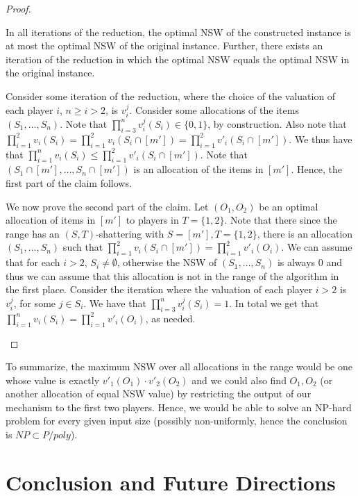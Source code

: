 \documentclass{theoretics}
\begin{document}
\begin{proof}
\begin{claim*}
In all iterations of the reduction, the optimal NSW of the constructed instance is at most the optimal NSW of the original instance. Further, there exists an iteration of the reduction in which the optimal NSW equals the optimal NSW in the original instance. 
\end{claim*}
\begin{subproof}
Consider some iteration of the reduction, where the choice of the valuation of each player $i$, $n\geq i>2$, is $v_i^j$. Consider some allocations of the items $(S_1,\ldots, S_n)$. Note that $\prod_{i=3}^{n} v_i^j(S_i)\in \{0,1\}$, by construction. Also note that $\prod_{i=1}^{2} v_i(S_i)=\prod_{i=1}^{2} v_i(S_i\cap [m'])=\prod_{i=1}^{2} v'_i(S_i\cap [m'])$. We thus have that $\prod_{i=1}^{n} v_i(S_i) \leq \prod_{i=1}^{2} v'_i(S_i\cap [m'])$.  Note that $(S_1\cap [m'], \ldots, S_n \cap [m'])$ is an allocation of the items in $[m']$. Hence, the first part of the claim follows.

We now prove the second part of the claim. Let $(O_1,O_2)$ be an optimal allocation of items in $[m']$ to players in $T=\{1,2\}$. Note that there since the range has an $(S,T)$-shattering with $S = [m'], T=\{1,2\}$, there is an allocation $(S_1,\ldots, S_n)$ such that $\prod_{i=1}^{2} v_i(S_i \cap [m']) = \prod_{i=1}^{2}{v'_i}(O_i)$. We can assume that for each $i > 2$, $S_i \neq \emptyset$, otherwise the NSW of $(S_1,\ldots, S_n)$ is always $0$ and thus we can assume that this allocation is not in the range of the algorithm in the first place. Consider the iteration where the valuation of each player $i>2$ is $v_i^j$, for some $j \in S_i$. We have that $\prod_{i=3}^{n} v_i^j(S_i)=1$. In total we get that $\prod_{i=1}^{n} v_i(S_i) = \prod_{i=1}^{2} v'_i(O_i)$, as needed.
\end{subproof}
\end{proof}


To summarize, the maximum NSW over all allocations in the range would be one whose value is exactly $v'_1(O_1)\cdot  v'_2(O_2)$ and we could also find $O_1, O_2$ (or another allocation of equal NSW value) by restricting the output of our mechanism to the first two players. Hence, we would be able to solve an NP-hard problem for every given input size (possibly non-uniformly, hence the conclusion is $NP \subset P/poly$).







\section{Conclusion and Future Directions}
\end{document}
